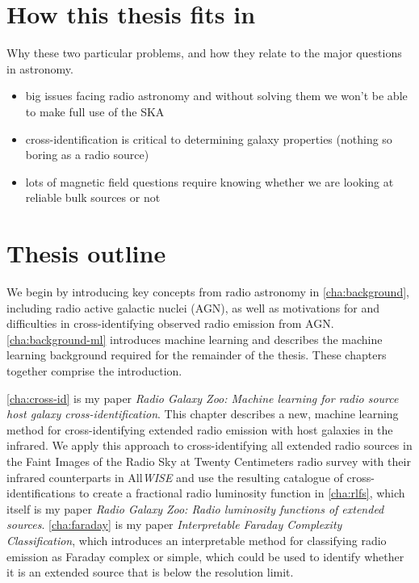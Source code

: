 \section{How this thesis fits in}
\label{sec:how-this-fits}
    Why these two particular problems, and how they relate to the major questions in astronomy. \begin{itemize}
        \item big issues facing radio astronomy and without solving them we won't be able to make full use of the SKA
        \item cross-identification is critical to determining galaxy properties (nothing so boring as a radio source)
        \item lots of magnetic field questions require knowing whether we are looking at reliable bulk sources or not
    \end{itemize}


\section{Thesis outline}
\label{sec:outline}

We begin by introducing key concepts from radio astronomy in \autoref{cha:background}, including radio active galactic nuclei (AGN), as well as motivations for and difficulties in cross-identifying observed radio emission from AGN. \autoref{cha:background-ml} introduces machine learning and describes the machine learning background required for the remainder of the thesis. These chapters together comprise the introduction.

\autoref{cha:cross-id} is my paper \emph{Radio Galaxy Zoo: Machine learning for radio source host galaxy cross-identification}. This chapter describes a new, machine learning method for cross-identifying extended radio emission with host galaxies in the infrared. We apply this approach to cross-identifying all extended radio sources in the Faint Images of the Radio Sky at Twenty Centimeters radio survey \citep[FIRST;][]{becker95first} with their infrared counterparts in All\emph{WISE} \citep{cutri2013wiseexplanatory} and use the resulting catalogue of cross-identifications to create a fractional radio luminosity function in \autoref{cha:rlfs}, which itself is my paper \emph{Radio Galaxy Zoo: Radio luminosity functions of extended sources}. \autoref{cha:faraday} is my paper \emph{Interpretable Faraday Complexity Classification}, which introduces an interpretable method for classifying radio emission as Faraday complex or simple, which could be used to identify whether it is an extended source that is below the resolution limit.

